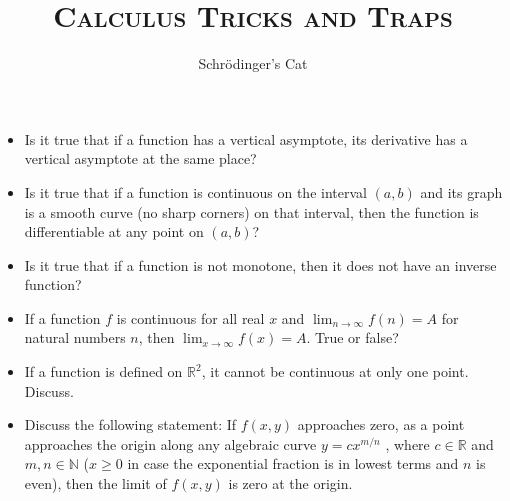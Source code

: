 \documentclass[10pt,a4paper]{article}
\title{\textsc{Calculus Tricks and Traps}}
\date{}
\author{Schrödinger's Cat}
\begin{document}
\maketitle
\newpage

\begin{itemize}
\item Is it true that if a function has a vertical asymptote, its derivative has a vertical asymptote at the same place?
\item Is it true that if a function is continuous on the interval $(a,b)$ and its graph is a smooth curve (no sharp corners) on that interval, then the function is differentiable at any point on $(a, b)$?
\item Is it true that if  a function is not monotone, then it does not have an inverse function?
\item If a function $f$ is continuous for all real $x$ and $\lim_{n \to \infty} f(n) = A$ for natural numbers $n$, then $\lim_{x \to \infty} f(x) = A$. True or false?
\item If a function is defined on $\mathbb{R}^2$, it cannot be continuous at only one point. Discuss.
\item Discuss the following statement: If $f(x,y)$ approaches zero, as a point approaches the origin along any algebraic curve $y = cx^{m/n}$ , where $c \in \mathbb{R}$ and $m,n \in \mathbb{N}$ ($x \geq 0$ in case the exponential fraction is in lowest terms and $n$ is even), then the limit of $f(x,y)$ is zero at the origin.
\end{itemize}
\end{document}
